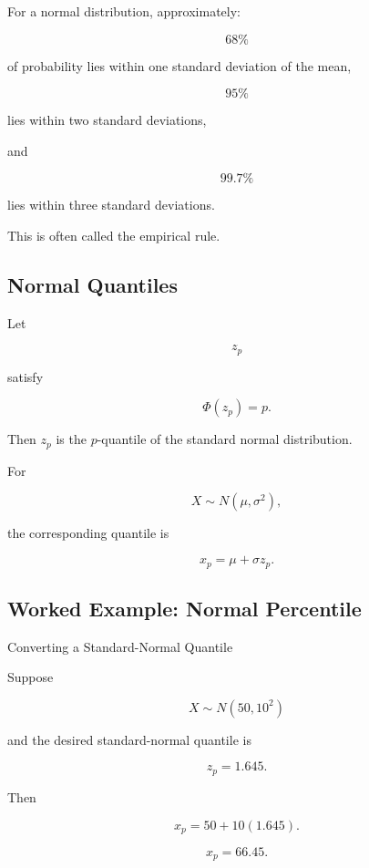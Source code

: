 For a normal distribution, approximately:

\[
\boxed{
68\%
}
\]

of probability lies within one standard deviation of the mean,

\[
\boxed{
95\%
}
\]

lies within two standard deviations,

and

\[
\boxed{
99.7\%
}
\]

lies within three standard deviations.

This is often called the empirical rule.

\subsection{Normal Quantiles}
\label{subsec:normal-quantiles}

Let

\[
z_p
\]

satisfy

\[
\boxed{
\Phi(z_p)=p.
}
\]

Then \(z_p\) is the \(p\)-quantile of the standard normal distribution.

For

\[
X\sim N(\mu,\sigma^2),
\]

the corresponding quantile is

\[
\boxed{
x_p
=
\mu+\sigma z_p.
}
\]

\subsection{Worked Example: Normal Percentile}
\label{subsec:worked-normal-percentile}

\begin{workedexamplebox}{Converting a Standard-Normal Quantile}

Suppose

\[
X\sim N(50,10^2)
\]

and the desired standard-normal quantile is

\[
z_p=1.645.
\]

Then

\[
x_p
=
50+10(1.645).
\]

\begin{answerbox}
\[
\boxed{
x_p=66.45.
}
\]
\end{answerbox}

\end{workedexamplebox}

